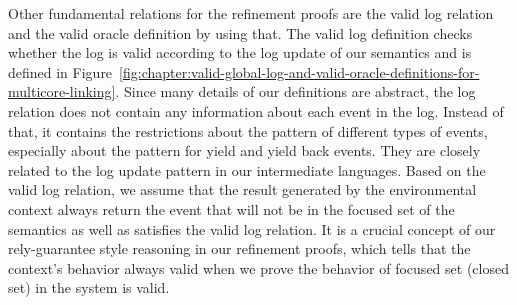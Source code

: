 Other fundamental relations for the refinement proofs are the valid log relation and the valid oracle definition by using that.
The valid log definition checks whether the log is valid according to the log update of our semantics and
is defined in Figure~\ref{fig:chapter:valid-global-log-and-valid-oracle-definitions-for-multicore-linking}.
Since many details of our definitions are abstract, the log relation does not contain any information 
about each event in the log.
Instead of that, it contains the restrictions about the pattern of different types of events, especially about the pattern for yield and  yield back events.
They are closely related to the log update pattern in our intermediate languages. 
Based on the valid log relation, 
we assume that the result generated by the environmental context always return the event that 
will not be in the focused set of the semantics as well as satisfies the valid log relation.
It is a crucial concept of our rely-guarantee style reasoning in our refinement proofs, which tells that the context's behavior always valid when we prove the behavior of focused set (closed set) in the system is valid. 


